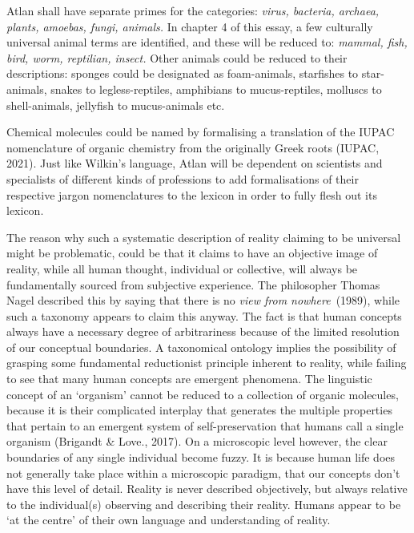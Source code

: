 Atlan shall have separate primes for the categories: \textit{virus, bacteria, archaea, plants, amoebas, fungi, animals.} In chapter 4 of this essay, a few culturally universal animal terms are identified, and these will be reduced to: \textit{mammal, fish, bird, worm, reptilian, insect.} Other animals could be reduced to their descriptions: sponges could be designated as foam-animals, starfishes to star-animals, snakes to legless-reptiles, amphibians to mucus-reptiles, molluscs to shell-animals, jellyfish to mucus-animals etc.  


Chemical molecules could be named by formalising a translation of the IUPAC nomenclature of organic chemistry from the originally Greek roots (IUPAC, 2021). Just like Wilkin’s language, Atlan will be dependent on scientists and specialists of different kinds of professions to add formalisations of their respective jargon nomenclatures to the lexicon in order to fully flesh out its lexicon. 

The reason why such a systematic description of reality claiming to be universal might be problematic, could be that it claims to have an objective image of reality, while all human thought, individual or collective, will always be fundamentally sourced from subjective experience. The philosopher Thomas Nagel described this by saying that there is no \textit{view from nowhere}\ (1989), while such a taxonomy appears to claim this anyway. The fact is that human concepts always have a necessary degree of arbitrariness because of the limited resolution of our conceptual boundaries. A taxonomical ontology implies the possibility of grasping some fundamental reductionist principle inherent to reality, while failing to see that many human concepts are emergent phenomena. The linguistic concept of an ‘organism’ cannot be reduced to a collection of organic molecules, because it is their complicated interplay that generates the multiple properties that pertain to an emergent system of self-preservation that humans call a single organism (Brigandt \& Love., 2017). On a microscopic level however, the clear boundaries of any single individual become fuzzy. It is because human life does not generally take place within a microscopic paradigm, that our concepts don’t have this level of detail. Reality is never described objectively, but always relative to the individual(s) observing and describing their reality. Humans appear to be ‘at the centre’ of their own language and understanding of reality. 

